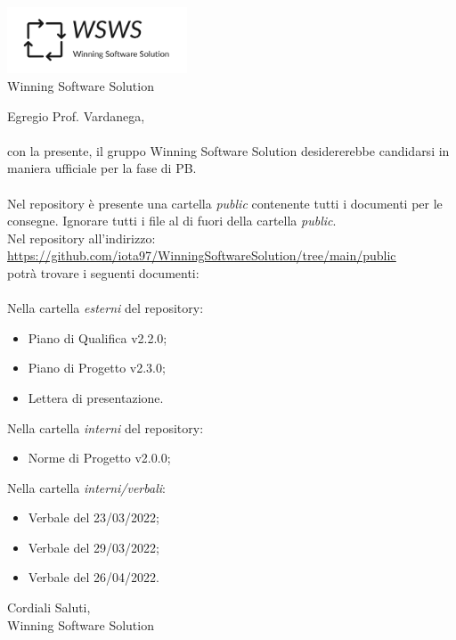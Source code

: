 \documentclass[a4paper, 12pt]{letter}
\begin{document}
\begin{center}
\includegraphics[width=0.4\textwidth]{WSWS-logos_transparent_crop}\\
{\Large Winning Software Solution}\\[24pt]
\end{center}
Egregio Prof. Vardanega,\\\\
con la presente, il gruppo Winning Software Solution desidererebbe candidarsi in maniera ufficiale
per la fase di PB.\\\\
Nel repository è presente una cartella \textit{public} contenente tutti i documenti per le consegne. Ignorare tutti i file
al di fuori della cartella \textit{public}.\\
Nel repository all'indirizzo: \\
\href{https://github.com/iota97/WinningSoftwareSolution/tree/main/public}{\underline{https://github.com/iota97/WinningSoftwareSolution/tree/main/public}}\\ 
potrà trovare i seguenti documenti:\\\\

Nella cartella \textit{esterni} del repository:
\begin{itemize}
\item Piano di Qualifica v2.2.0;
\item Piano di Progetto v2.3.0;
\item Lettera di presentazione.
\end{itemize}
Nella cartella \textit{interni} del repository:
\begin{itemize}
    \item Norme di Progetto v2.0.0;
\end{itemize}

Nella cartella \textit{interni/verbali}:
\begin{itemize}
    \item Verbale del 23/03/2022;
    \item Verbale del 29/03/2022;
    \item Verbale del 26/04/2022.
\end{itemize}
\begin{flushright}
Cordiali Saluti,\\
Winning Software Solution
\end{flushright}
\end{document}
